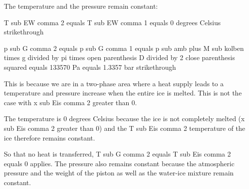 The temperature and the pressure remain constant:

T sub EW comma 2 equals T sub EW comma 1 equals 0 degrees Celsius strikethrough

p sub G comma 2 equals p sub G comma 1 equals p sub amb plus M sub kolben times g divided by pi times open parenthesis D divided by 2 close parenthesis squared equals 133570 Pa equals 1.3357 bar strikethrough

This is because we are in a two-phase area where a heat supply leads to a temperature and pressure increase when the entire ice is melted. This is not the case with x sub Eis comma 2 greater than 0.

The temperature is 0 degrees Celsius because the ice is not completely melted (x sub Eis comma 2 greater than 0) and the T sub Eis comma 2 temperature of the ice therefore remains constant.

So that no heat is transferred, T sub G comma 2 equals T sub Eis comma 2 equals 0 applies. The pressure also remains constant because the atmospheric pressure and the weight of the piston as well as the water-ice mixture remain constant.